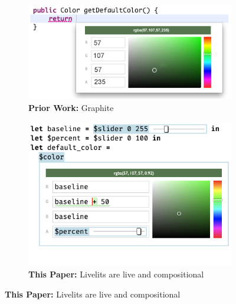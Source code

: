 \begin{figure}
  \begin{minipage}[t]{0.37\textwidth}
    \begin{subfigure}[t]{\linewidth}
    \begin{snugshade}
      \vspace*{-2mm}
      \caption{\textbf{Prior Work:} Graphite \cite{Graphite}}
       \label{fig:graphite}
      \vspace*{1mm}
     \end{snugshade}
      \vspace*{-1mm}
      \includegraphics[width=\linewidth]{graphite-color-palette-green.png}
      \vspace*{-5mm}
    \end{subfigure}
    \hspace{8mm}
    \begin{subfigure}[t]{\linewidth}
     \begin{snugshade}
      \vspace*{-2mm}
      \caption{\textbf{This Paper:} Livelits are live and compositional}
    \label{fig:color}
      \vspace*{1mm}
     \end{snugshade}
      \vspace*{-1mm}
      \includegraphics[width=\linewidth]{slider-color-livelits.png}

\end{subfigure}
\end{minipage}
\end{figure}

